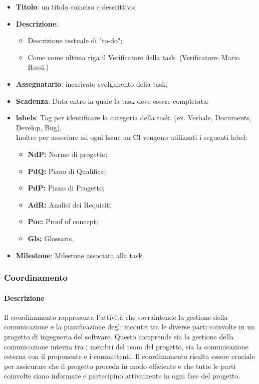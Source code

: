 \begin{itemize}
    \item \textbf{Titolo}: un titolo coinciso e descrittivo;
    \item \textbf{Descrizione}:
    \begin{itemize}
        \item Descrizione testuale di "to-do";
        \item Come come ultima riga il Verificatore della task. (Verificatore: Mario Rossi.)
    \end{itemize} 
    \item \textbf{Assegnatario}: incaricato svolgimento della task;
    \item \textbf{Scadenza}: Data entro la quale la task deve essere completata;
    \item \textbf{labels}: Tag per identificare la categoria della task. (ex. Verbale, Documents, Develop, Bug).\\ Inoltre per associare ad ogni Issue un CI vengono utilizzati i seguenti label:
    \begin{itemize}
        \item \textbf{NdP:} Norme di progetto;
        \item \textbf{PdQ:} Piano di Qualifica;
        \item \textbf{PdP:} Piano di Progetto;
        \item \textbf{AdR:} Analisi dei Requisiti;
        \item \textbf{Poc:} Proof of concept;
        \item \textbf{Gls:} Glossario.
    \end{itemize}
    \item \textbf{Milestone}: Milestone associata alla task.
\end{itemize}

\subsubsection{Coordinamento}

\paragraph{Descrizione}
Il coordinamento rappresenta l'attività che sovraintende la gestione della comunicazione e la pianificazione degli incontri tra le diverse parti coinvolte in un progetto di ingegneria del software. Questo comprende sia la gestione della comunicazione interna tra i membri del team del progetto, sia la comunicazione esterna con il proponente e i committenti. Il coordinamento risulta essere cruciale per assicurare che il progetto proceda in modo efficiente e che tutte le parti coinvolte siano informate e partecipino attivamente in ogni fase del progetto.

